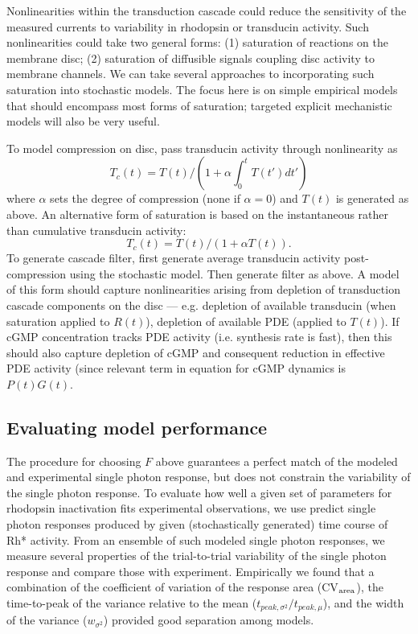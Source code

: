 \documentclass[12pt]{article}
\begin{document}
Nonlinearities within the transduction cascade could reduce the sensitivity of the measured currents to variability in rhodopsin or transducin activity.  Such nonlinearities could take two general forms: (1) saturation of reactions on the membrane disc; (2) saturation of diffusible signals coupling disc activity to membrane channels.  We can take several approaches to incorporating such saturation into stochastic models.  The focus here is on simple empirical models that should encompass most forms of saturation; targeted explicit mechanistic models will also be very useful. 

To model compression on disc, pass transducin activity through nonlinearity as
\begin{equation}
T_c(t) = T(t) / (1 + \alpha \int_0^t T(t') dt')
\end{equation}
where $\alpha$ sets the degree of compression (none if $\alpha = 0$) and $T(t)$ is generated as above.  An alternative form of saturation is based on the instantaneous rather than cumulative transducin activity:
\begin{equation}
T_c(t) = T(t) / (1 + \alpha T(t)).
\end{equation}
To generate cascade filter, first generate average transducin activity post-compression using the stochastic model.  Then generate filter as above.  A model of this form should capture nonlinearities arising from depletion of transduction cascade components on the disc --- e.g. depletion of available transducin (when saturation applied to $R(t)$), depletion of available PDE (applied to $T(t)$).  If cGMP concentration tracks PDE activity (i.e. synthesis rate is fast), then this should also capture depletion of cGMP and consequent reduction in effective PDE activity (since relevant term in equation for cGMP dynamics is $P(t) G(t)$.  


\subsection{Evaluating model performance}

The procedure for choosing $F$ above guarantees a perfect match of the modeled and experimental single photon response, but does not constrain the variability of the single photon response.  To evaluate how well a given set of parameters for rhodopsin inactivation fits experimental observations, we use predict single photon responses produced by given (stochastically generated) time course of Rh* activity.  From an ensemble of such modeled single photon responses, we measure several properties of the trial-to-trial variability of the single photon response and compare those with experiment.  Empirically we found that a combination of the coefficient of variation of the response area (CV$_{\rm area}$), the time-to-peak of the variance relative to the mean ($t_{peak,\sigma^2} / t_{peak, \mu}$), and the width of the variance ($w_{\sigma^2}$) provided good separation among models. 
\end{document}
